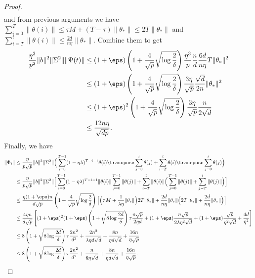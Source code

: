 \begin{proof}
\begin{align*}
    \end{align*}
    and from previous arguments we have $\sum_{i=0}^T \|\theta(i)\| \leq \tau M + (T-\tau) \|\theta_*\| \leq 2T \|\theta_*\|$ and $\sum_{i=T}^t \|\theta(i)\| \leq \frac{2d}{n\eta}\|\theta_*\|$. Combine them to get 
    \begin{align*}
        \frac{\eta^3}{p^2} \|b\|^2 \|\Sigma^2\| \|\Psi(t)\| & \leq (1+\eps) \left(1 + \frac{4}{\sqrt p}\sqrt{\log\frac{2}{\delta}}\right) \frac{\eta^3}{p} \frac{n}{d} \frac{6d}{n\eta} T \|\theta_*\|^2 \\
        & \leq (1+\eps) \left(1 + \frac{4}{\sqrt p}\sqrt{\log\frac{2}{\delta}}\right) \frac{3\eta}{\sqrt{p}} \frac{\sqrt{d}}{2n} \|\theta_*\|^2 \\
        & \leq (1+\eps)^2 \left(1 + \frac{4}{\sqrt p}\sqrt{\log\frac{2}{\delta}}\right) \frac{3\eta}{\sqrt{p}} \frac{n}{2\sqrt{d}} \\
        & \leq \frac{12n\eta}{\sqrt{dp}}.
    \end{align*}
    Finally, we have 
    \begin{align*}
        \|\Phi_t\| & \leq \frac{\eta}{p\sqrt{p}} \|b\|^2 \|\Sigma^2\| \Big( \sum_{i=0}^{T-1} (1-\eta\lambda)^{T-i-1}\theta(i)\transpose  \sum_{j=0}^i \theta(j) + \sum_{i=T}^t \theta(i)\transpose  \sum_{j=0}^i \theta(j) \Big) \\
        & \leq \frac{\eta}{p\sqrt{p}} \|b\|^2 \|\Sigma^2\| \Big[ \sum_{i=0}^{T-1} (1-\eta\lambda)^{T-i-1} \|\theta(i)\|  \sum_{j=0}^{T-1} \|\theta(j)\| + \sum_{i=T}^t \|\theta(i)\|  \Big( \sum_{j=0}^{T-1} \|\theta(j)\| + \sum_{j=T}^i \|\theta(j)\| \Big) \Big] \\
        & \leq \frac{\eta(1+\eps)n}{d\sqrt{p}} \left(1 + \frac{4}{\sqrt p}\sqrt{\log\frac{2}{\delta}}\right) \Big[ \Big( \tau M + \frac{1}{\lambda\eta} \|\theta_*\| \Big) 2T \|\theta_*\| + \frac{2d}{n\eta}\|\theta_*\|  \Big( 2T \|\theta_*\| + \frac{2d}{n\eta}\|\theta_*\| \Big) \Big] \\
        & \leq \frac{4\eta n}{d\sqrt{p}} \left[ (1+\eps)^2 (1+\eps)\left(1 + \sqrt{8\log\frac{2d}{\delta}}\right) \tau \frac{n\sqrt{p}}{2\eta d} + (1+\eps) \frac{n\sqrt{p}}{2\lambda\eta^2\sqrt{d}} + (1+\eps) \frac{\sqrt{p}}{\eta^2\sqrt{d}} + \frac{4d}{\eta^2} \right] \\
        & \leq 8\left(1 + \sqrt{8\log\frac{2d}{\delta}}\right) \tau \frac{2n^2}{d^2} + \frac{2n^2}{\lambda\eta d\sqrt{d}} + \frac{8n}{\eta d\sqrt{d}} + \frac{16n}{\eta\sqrt{p}} \\
        & \leq 8\left(1 + \sqrt{8\log\frac{2d}{\delta}}\right) \tau \frac{2n^2}{d^2} + \frac{n}{6\eta \sqrt{d}} + \frac{8n}{\eta d\sqrt{d}} + \frac{16n}{\eta\sqrt{p}}.

\end{align*}
\end{proof}
